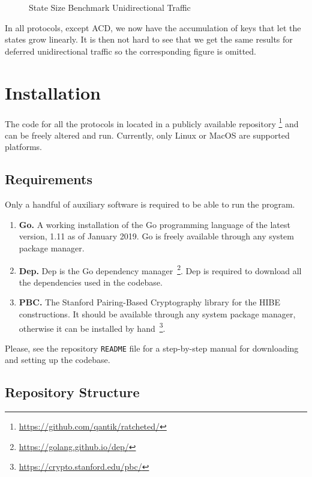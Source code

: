 \documentclass[11pt,a4paper,twoside,openright,bibliography=totoc]{scrbook}
\begin{document}
\begin{figure}[H]
  \centering
   
  \caption{State Size Benchmark Unidirectional Traffic}
  \label{fig:state-size-uni}
\end{figure}

In all protocols, except ACD, we now have the accumulation
of keys that let the states grow linearly. It is then not
hard to see that we get the same results for deferred
unidirectional traffic so the corresponding figure
is omitted.

\section{Installation}
\label{sec:installation}

The code for all the protocols in located in a
publicly available repository
\footnote{\url{https://github.com/qantik/ratcheted/}} and
can be freely altered and run. Currently, only Linux
or MacOS are supported platforms.

\subsection{Requirements}
\label{sec:requirements}

Only a handful of auxiliary software is required to
be able to run the program.
\begin{enumerate}
\item \textbf{Go.} A working installation of the
  Go programming language of the latest version, 1.11 as of
  January 2019. Go is freely available through any
  system package manager.
\item \textbf{Dep.} Dep is the Go dependency
  manager~\footnote{\url{https://golang.github.io/dep/}}. Dep
  is required to download all the dependencies used
  in the codebase.
\item \textbf{PBC.} The Stanford Pairing-Based Cryptography library
  for the HIBE constructions. It should be available through any
  system package manager, otherwise it can be installed by
  hand~\footnote{\url{https://crypto.stanford.edu/pbc/}}.
\end{enumerate}
Please, see the repository \texttt{README} file for a
step-by-step manual for downloading and setting
up the codebase.

\subsection{Repository Structure}
\label{sec:repository-structure}
\end{document}
